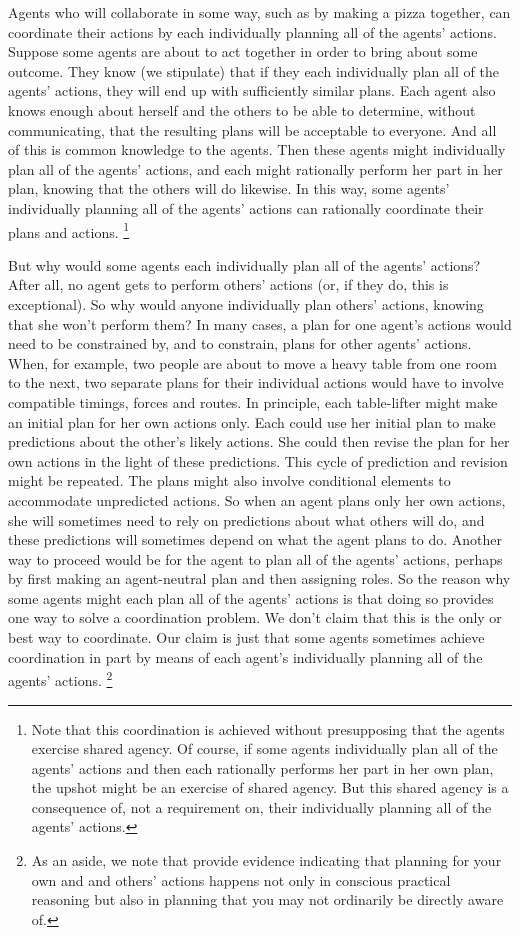 \documentclass[12pt,\papersize]{extarticle}
\begin{document}
Agents who will collaborate in some way, such as by making a pizza together, can coordinate their actions by each individually planning all of the agents' actions.
Suppose some agents 
	 are about to act together in order to bring about some outcome.
They know (we stipulate) that if they each individually plan all of the agents' actions, they will end up with sufficiently similar plans.
Each agent also knows enough about herself and the others to be able to determine, without communicating, that the resulting plans will be acceptable to everyone. 
And all of this is common knowledge to the agents.  
Then these agents 
might individually plan all of the agents' actions,
and each might rationally perform her part in her plan, knowing that the others will do likewise.
In this way, 
 some agents' individually planning all of the agents' actions can rationally coordinate their plans and actions.%
\footnote{
Note that this coordination is achieved without presupposing that the agents exercise shared agency.
Of course,
	if some agents individually plan all of the agents' actions
	and then each rationally performs her part in her own plan,
	the upshot might be an exercise of shared agency.
But this shared agency is a consequence of, not a requirement on, their individually planning all of the agents' actions.
}


But why would some agents each individually plan all of the agents' actions?
After all, no agent gets  to perform  others' actions
(or, if they do, this is exceptional).
So why would anyone individually plan others' actions, knowing that she won't perform them?
In many cases, 
a plan for one agent's actions would need to be constrained by, and to constrain, plans for other agents' actions.
When, for example,
two people are about to move a heavy table from one room to the next,
two separate plans for their individual actions would have to involve compatible timings, forces and routes.
In principle,  each table-lifter might make an initial plan for her own actions only.
Each could use her initial plan to make predictions about the  other's likely actions.
She could then revise the plan for her own actions in the light of these predictions.
This cycle of prediction and revision might be repeated.
The plans might also involve conditional elements to accommodate unpredicted actions.
So when an agent plans only her own actions,
 she will sometimes need to rely on predictions about what others will do,
 and these predictions will sometimes depend on what the agent plans to do.
Another 
 way to proceed
	would be for the agent to plan all of the agents' actions,
perhaps by first making an agent-neutral plan and then assigning roles.
So the reason why some agents might each plan all of the agents' actions is that doing so provides one way to solve a coordination problem.
We don't claim that this is the only or best way to coordinate.
Our claim is just that some agents sometimes achieve coordination in part by means of each agent's individually planning all of the agents' actions.%
\footnote{
As an aside, we note that 
\citet{tsai:2011_groop_effect} provide evidence indicating that planning for your own and and others' actions happens not only in conscious practical reasoning but also in planning that you may not ordinarily be directly aware of.
}
\end{document}
